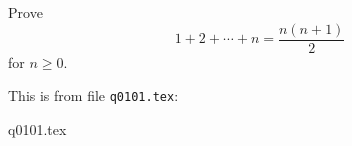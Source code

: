 Prove
\[
1 + 2 + \cdots + n = \frac{n(n + 1)}{2}
\]
for $n \geq 0$.

This is from file \verb!q0101.tex!:

{q0101.tex}
